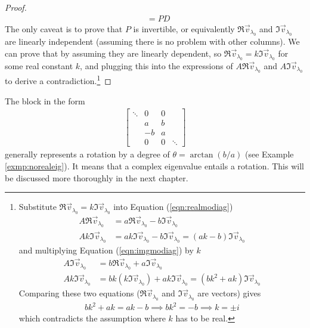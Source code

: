 \begin{proof}
\begin{align*}
&= PD
\end{align*}
The only caveat is to prove that $P$ is invertible, or equivalently $\Re{\vec{v}_{\lambda_0}}$ and $\Im{\vec{v}_{\lambda_0}}$ are linearly independent (assuming there is no problem with other columns). We can prove that by assuming they are linearly dependent, so $\Re{\vec{v}_{\lambda_0}} = k\Im{\vec{v}_{\lambda_0}}$ for some real constant $k$, and plugging this into the expressions of $A\Re{\vec{v}_{\lambda_0}}$ and $A\Im{\vec{v}_{\lambda_0}}$ to derive a contradiction.\footnote{Substitute $\Re{\vec{v}_{\lambda_0}} = k\Im{\vec{v}_{\lambda_0}}$ into Equation (\ref{eqn:realmodiag})
\begin{align*}
A\Re{\vec{v}_{\lambda_0}} &= a\Re{\vec{v}_{\lambda_0}} - b\Im{\vec{v}_{\lambda_0}} \\
Ak\Im{\vec{v}_{\lambda_0}} &= ak\Im{\vec{v}_{\lambda_0}} - b\Im{\vec{v}_{\lambda_0}} = (ak-b)\Im{\vec{v}_{\lambda_0}}
\end{align*}
and multiplying Equation (\ref{eqn:imgmodiag}) by $k$
\begin{align*}
A\Im{\vec{v}_{\lambda_0}} &= b\Re{\vec{v}_{\lambda_0}} + a\Im{\vec{v}_{\lambda_0}} \\
Ak \Im{\vec{v}_{\lambda_0}} &= bk(k\Im{\vec{v}_{\lambda_0}}) + ak\Im{\vec{v}_{\lambda_0}} = (bk^2 + ak)\Im{\vec{v}_{\lambda_0}}
\end{align*}
Comparing these two equations ($\Re{\vec{v}_{\lambda_0}}$ and $\Im{\vec{v}_{\lambda_0}}$ are  vectors) gives
\begin{align*}
bk^2 + ak = ak - b \implies bk^2 = -b \implies k = \pm i
\end{align*}
which contradicts the assumption where $k$ has to be real.}
\end{proof}

The block in the form
\begin{align*}
\begin{bmatrix}
\ddots & 0 & 0 & \\
& a & b & \\
& -b & a & \\
& 0 & 0 & \ddots
\end{bmatrix}    
\end{align*}
generally represents a rotation by a degree of $\theta = \arctan(b/a)$ (see Example \ref{exmp:norealeig}). It means that a complex eigenvalue entails a rotation. This will be discussed more thoroughly in the next chapter.

